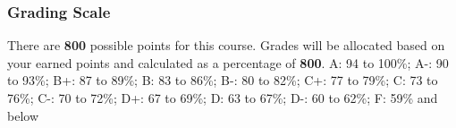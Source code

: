 \hypertarget{grading-scale}{%
\subsubsection{Grading Scale}\label{grading-scale}}

There are \textbf{800} possible points for this course. Grades will be
allocated based on your earned points and calculated as a percentage of
\textbf{800}. A: 94 to 100\%; A-: 90 to 93\%; B+: 87 to 89\%; B: 83 to
86\%; B-: 80 to 82\%; C+: 77 to 79\%; C: 73 to 76\%; C-: 70 to 72\%; D+:
67 to 69\%; D: 63 to 67\%; D-: 60 to 62\%; F: 59\% and below
